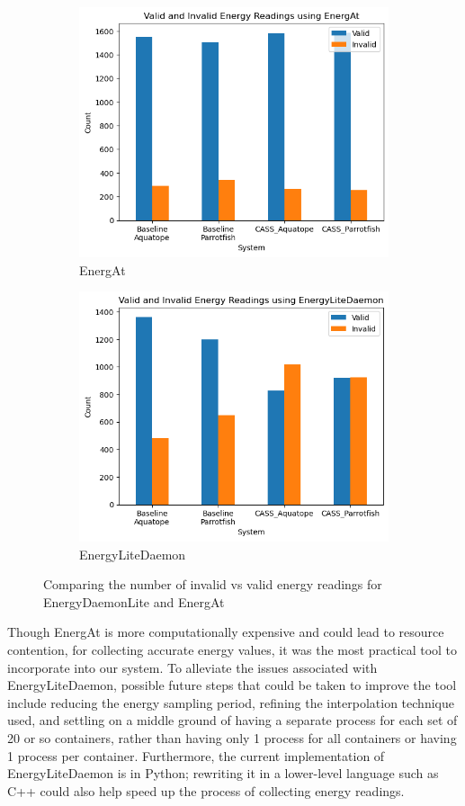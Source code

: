\documentclass[times, 10pt,twocolumn]{article}
\begin{document}
\begin{figure}[H] %
   \centering
   \begin{subfigure}[b]{0.5\textwidth} %
         \centering
         \includegraphics[width=0.6\linewidth]{imgs/final_experiment_plots/valid_vs_invalid/EnergAt.png}
         \caption{EnergAt}
         \label{fig:energy_tool_efficacy_a}
   \end{subfigure}
   \begin{subfigure}[b]{0.5\textwidth} %
         \centering
         \includegraphics[width=0.6\linewidth]{imgs/final_experiment_plots/valid_vs_invalid/EnergyLiteDaemon.png}
         \caption{EnergyLiteDaemon}
         \label{fig:energy_tool_efficacy_b}
   \end{subfigure}
   
   \caption{Comparing the number of invalid vs valid energy readings for EnergyDaemonLite and EnergAt}
   \label{fig:energy_tool_efficacy}
\end{figure}

Though EnergAt is more computationally expensive and could lead to resource contention, for collecting accurate energy values, it was the most practical tool to incorporate into our system. To alleviate the issues associated with EnergyLiteDaemon, possible future steps that could be taken to improve the tool include reducing the energy sampling period, refining the interpolation technique used, and settling on a middle ground of having a separate process for each set of 20 or so containers, rather than having only 1 process for all containers or having 1 process per container. Furthermore, the current implementation of EnergyLiteDaemon is in Python; rewriting it in a lower-level language such as C++ could also help speed up the process of collecting energy readings.
\end{document}
